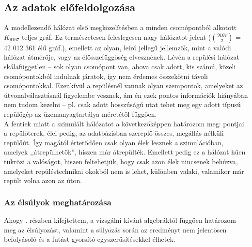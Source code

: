     \subsection{Az adatok előfeldolgozása}
    A modellezendő hálózat első megközelítésben a minden csomópontból alkotott $K_{9167}$ teljes gráf. Ez természetesen feleslegesen nagy hálózatot jelent ($9167 \choose 2$ = 42 012 361 élű gráf.), emellett az olyan, leíró jellegű jellemzők, mint a valódi hálózat átmérője, vagy az élösszefüggőség elvesznének. Lévén a repülési hálózat skálafüggetlen -- sok olyan csomópont van, ahova csak adott, kis számú, közeli csomópontokból indulnak járatok, így nem érdemes összekötni távoli csomópontokkal. Ezenkívül a repülésnél vannak olyan szempontok, amelyeket az útvonalválasztásnál figyelembe vesznek, ám én ezek pontos információk hiányában nem tudom kezelni -- pl. csak adott hosszúságú utat tehet meg egy adott típusú repülőgép az üzemanyagtartálya méretétől függően.\\

    A fentiek miatt a szimulált hálózatot a következőképpen határozom meg: pontjai a repülőterek, élei pedig, az adatbázisban szereplő összes, megállás nélküli repülőút. Így magától értetődően csak olyan élek lesznek a szimulációban, amelyek ,,átrepülhetők'', hiszen már átrepülték. Emellett pedig ez a hálózat hűen tükrözi a valóságot, hiszen feltehetjük, hogy csak azon élek nincsenek behúzva, amelyeket repüléstechnikai okokból nem is lehet, különben valaki, valamikor már repült volna azon az úton.

      \subsubsection{Az élsúlyok meghatározása}
      Ahogy . részben kifejtettem, a vizsgálni kívánt algebráktól függően határozom meg az élsúlyozást, valamint a súlyozás során az eredményt nem jelentősen befolyásoló és a futást gyorsító egyszerűsítésekkel élhetek.\\

